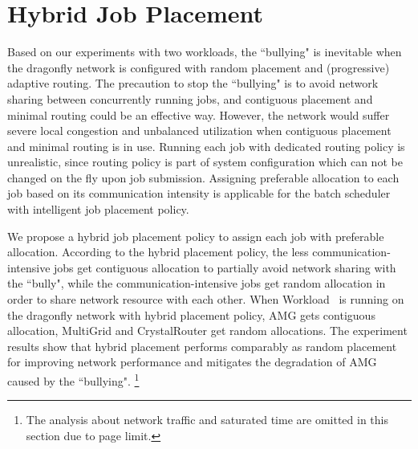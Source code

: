 \section{Hybrid Job Placement}
\label{sec: hybrid placement}

Based on our experiments with two workloads, the ``bullying" is inevitable when the dragonfly network is configured with random placement and (progressive) adaptive routing. 
The precaution to stop the ``bullying" is to avoid network sharing between concurrently running jobs, 
and contiguous placement and minimal routing could be an effective way. 
However, the network would suffer severe local congestion and unbalanced utilization when contiguous placement and minimal routing is in use. 
Running each job with dedicated routing policy is unrealistic, 
since routing policy is part of system configuration which can not be changed on the fly upon job submission. 
Assigning preferable allocation to each job based on its communication intensity is applicable for the batch scheduler with intelligent job placement policy. 



We propose a hybrid job placement policy to assign each job with preferable allocation. 
According to the hybrid placement policy, 
the less communication-intensive jobs get contiguous allocation to partially avoid network sharing with the ``bully", 
while the communication-intensive jobs get random allocation in order to share network resource with each other. 
When Workload~ is running on the dragonfly network with hybrid placement policy, 
AMG gets contiguous allocation, MultiGrid and CrystalRouter get random allocations. 
The experiment results show that hybrid placement performs comparably as random placement for improving network performance and mitigates the degradation of AMG caused by the ``bullying".
\footnote{The analysis about network traffic and saturated time are omitted in this section due to page limit.}


